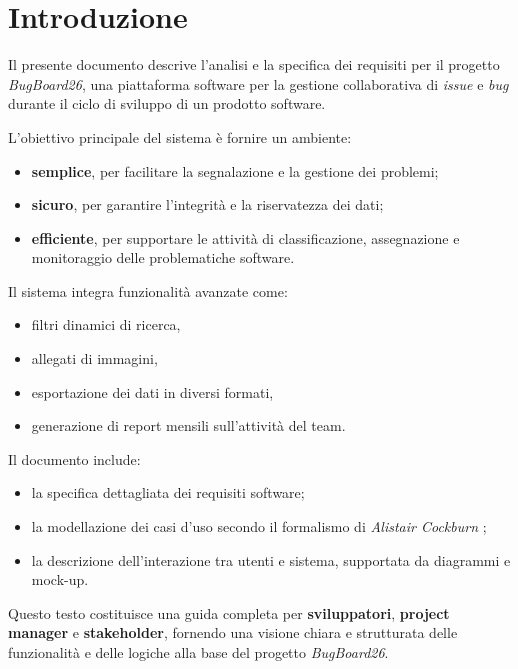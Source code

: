 \chapter{Introduzione}

Il presente documento descrive l'analisi e la specifica dei requisiti per il progetto \textit{BugBoard26}, 
una piattaforma software per la gestione collaborativa di \textit{issue} e \textit{bug} durante il ciclo di sviluppo di un prodotto software.  

\bigskip

L'obiettivo principale del sistema è fornire un ambiente:
\begin{itemize}
    \item \textbf{semplice}, per facilitare la segnalazione e la gestione dei problemi;
    \item \textbf{sicuro}, per garantire l'integrità e la riservatezza dei dati;
    \item \textbf{efficiente}, per supportare le attività di classificazione, assegnazione e monitoraggio delle problematiche software.
\end{itemize}

\bigskip

Il sistema integra funzionalità avanzate come:
\begin{itemize}
    \item filtri dinamici di ricerca,
    \item allegati di immagini,
    \item esportazione dei dati in diversi formati,
    \item generazione di report mensili sull'attività del team.
\end{itemize}

\bigskip

Il documento include:
\begin{itemize}
    \item la specifica dettagliata dei requisiti software;
    \item la modellazione dei casi d'uso secondo il formalismo di \textit{Alistair Cockburn} \cite{cockburn-use-cases};
    \item la descrizione dell'interazione tra utenti e sistema, supportata da diagrammi e mock-up.
\end{itemize}

\bigskip

Questo testo costituisce una guida completa per \textbf{sviluppatori}, \textbf{project manager} e \textbf{stakeholder}, 
fornendo una visione chiara e strutturata delle funzionalità e delle logiche alla base del progetto \textit{BugBoard26}.